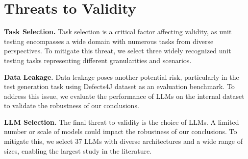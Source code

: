 \section{Threats to Validity}
\label{sec:validity}

\textbf{Task Selection.}
Task selection is a critical factor affecting validity, as unit testing encompasses a wide domain with numerous tasks from diverse perspectives.
To mitigate this threat, we select three widely recognized unit testing tasks representing different granularities and scenarios.

\textbf{Data Leakage.} 
Data leakage poses another potential risk, particularly in the test generation task using Defects4J dataset as an evaluation benchmark. To address this issue, we evaluate the performance of LLMs on the internal dataset to validate the robustness of our conclusions.

\textbf{LLM Selection.} 
The final threat to validity is the choice of LLMs. 
A limited number or scale of models could impact the robustness of our conclusions. 
To mitigate this, we select 37 LLMs with diverse architectures and a wide range of sizes, enabling the largest study in the literature.
